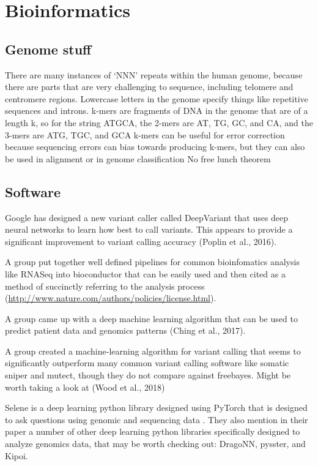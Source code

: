 \documentclass[]{book}
\begin{document}
\chapter{Bioinformatics}\label{bioinformatics}

\section{Genome stuff}\label{genome-stuff}

There are many instances of `NNN' repeats within the human genome,
because there are parts that are very challenging to sequence, including
telomere and centromere regions. Lowercase letters in the genome specify
things like repetitive sequences and introns. k-mers are fragments of
DNA in the genome that are of a length k, so for the string ATGCA, the
2-mers are AT, TG, GC, and CA, and the 3-mers are ATG, TGC, and GCA
k-mers can be useful for error correction because sequencing errors can
bias towards producing k-mers, but they can also be used in alignment or
in genome classification No free lunch theorem

\section{Software}\label{software}

Google has designed a new variant caller called DeepVariant that uses
deep neural networks to learn how best to call variants. This appears to
provide a significant improvement to variant calling accuracy (Poplin et
al., 2016).

A group put together well defined pipelines for common bioinfomatics
analysis like RNASeq into bioconductor that can be easily used and then
cited as a method of succinctly referring to the analysis process
(\url{http://www.nature.com/authors/policies/license.html}).

A group came up with a deep machine learning algorithm that can be used
to predict patient data and genomics patterns (Ching et al., 2017).

A group created a machine-learning algorithm for variant calling that
seems to significantly outperform many common variant calling software
like somatic sniper and mutect, though they do not compare against
freebayes. Might be worth taking a look at (Wood et al., 2018)

Selene is a deep learning python library designed using PyTorch that is
designed to ask questions using genomic and sequencing data
\citep{chen2019selene}. They also mention in their paper a number of
other deep learning python libraries specifically designed to analyze
genomics data, that may be worth checking out: DragoNN,
pysster\citep{budach2018pysster}, and Kipoi\citep{avsec2018kipoi}.
\end{document}
